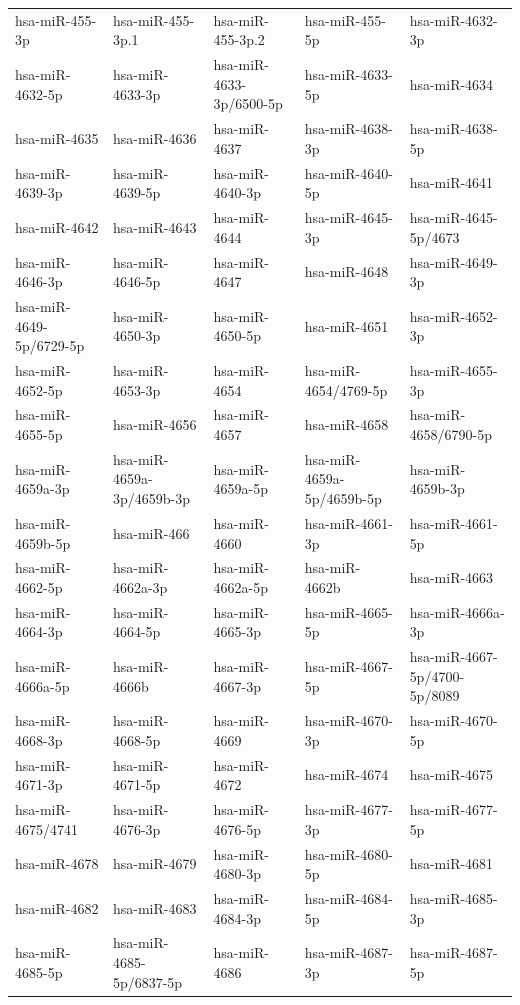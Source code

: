 \begin{longtable}{lllll}
hsa-miR-455-3p & hsa-miR-455-3p.1 & hsa-miR-455-3p.2 & hsa-miR-455-5p & hsa-miR-4632-3p \\
hsa-miR-4632-5p & hsa-miR-4633-3p & hsa-miR-4633-3p/6500-5p & hsa-miR-4633-5p & hsa-miR-4634 \\
hsa-miR-4635 & hsa-miR-4636 & hsa-miR-4637 & hsa-miR-4638-3p & hsa-miR-4638-5p \\
hsa-miR-4639-3p & hsa-miR-4639-5p & hsa-miR-4640-3p & hsa-miR-4640-5p & hsa-miR-4641 \\
hsa-miR-4642 & hsa-miR-4643 & hsa-miR-4644 & hsa-miR-4645-3p & hsa-miR-4645-5p/4673 \\
hsa-miR-4646-3p & hsa-miR-4646-5p & hsa-miR-4647 & hsa-miR-4648 & hsa-miR-4649-3p \\
hsa-miR-4649-5p/6729-5p & hsa-miR-4650-3p & hsa-miR-4650-5p & hsa-miR-4651 & hsa-miR-4652-3p \\
hsa-miR-4652-5p & hsa-miR-4653-3p & hsa-miR-4654 & hsa-miR-4654/4769-5p & hsa-miR-4655-3p \\
hsa-miR-4655-5p & hsa-miR-4656 & hsa-miR-4657 & hsa-miR-4658 & hsa-miR-4658/6790-5p \\
hsa-miR-4659a-3p & hsa-miR-4659a-3p/4659b-3p & hsa-miR-4659a-5p & hsa-miR-4659a-5p/4659b-5p & hsa-miR-4659b-3p \\
hsa-miR-4659b-5p & hsa-miR-466 & hsa-miR-4660 & hsa-miR-4661-3p & hsa-miR-4661-5p \\
hsa-miR-4662-5p & hsa-miR-4662a-3p & hsa-miR-4662a-5p & hsa-miR-4662b & hsa-miR-4663 \\
hsa-miR-4664-3p & hsa-miR-4664-5p & hsa-miR-4665-3p & hsa-miR-4665-5p & hsa-miR-4666a-3p \\
hsa-miR-4666a-5p & hsa-miR-4666b & hsa-miR-4667-3p & hsa-miR-4667-5p & hsa-miR-4667-5p/4700-5p/8089 \\
hsa-miR-4668-3p & hsa-miR-4668-5p & hsa-miR-4669 & hsa-miR-4670-3p & hsa-miR-4670-5p \\
hsa-miR-4671-3p & hsa-miR-4671-5p & hsa-miR-4672 & hsa-miR-4674 & hsa-miR-4675 \\
hsa-miR-4675/4741 & hsa-miR-4676-3p & hsa-miR-4676-5p & hsa-miR-4677-3p & hsa-miR-4677-5p \\
hsa-miR-4678 & hsa-miR-4679 & hsa-miR-4680-3p & hsa-miR-4680-5p & hsa-miR-4681 \\
hsa-miR-4682 & hsa-miR-4683 & hsa-miR-4684-3p & hsa-miR-4684-5p & hsa-miR-4685-3p \\
hsa-miR-4685-5p & hsa-miR-4685-5p/6837-5p & hsa-miR-4686 & hsa-miR-4687-3p & hsa-miR-4687-5p \\

\end{longtable}
